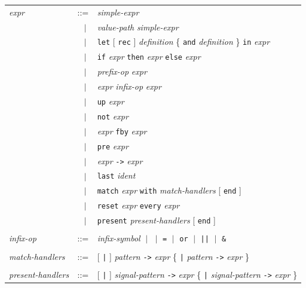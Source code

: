 \documentclass[11pt,titlepage,twoside]{report}
\newcommand{\alt}{\;|\;}
\newcommand{\Let}{\mbox{{\tt let}}}
\newcommand{\Rec}{\mbox{{\tt rec}}}
\newcommand{\In}{\mbox{{\tt in}}}
\newcommand{\And}{\mbox{{\tt and}}}
\newcommand{\Fun}{\mbox{{\tt fun}}}
\newcommand{\Function}{\mbox{{\tt function}}}
\newcommand{\If}{\mbox{{\tt if}}}
\newcommand{\Then}{\mbox{{\tt then}}}
\newcommand{\Else}{\mbox{{\tt else}}}
\newcommand{\Not}{\mbox{{\tt not}}}
\newcommand{\Up}{\mbox{{\tt up}}}
\newcommand{\Pre}{\mbox{{\tt pre}}}
\newcommand{\Last}{\mbox{{\tt last}}}
\newcommand{\Run}{\mbox{{\tt run}}}
\newcommand{\Fby}{\mbox{{\tt fby}}}
\newcommand{\Minusgreater}{\mbox{{\tt ->}}}
\newcommand{\Reset}{\mbox{{\tt reset}}}
\newcommand{\Every}{\mbox{{\tt every}}}
\newcommand{\End}{\mbox{{\tt end}}}
\newcommand{\Match}[2]{\mbox{\tt match}\ #1\ \mbox{\tt with}\ #2 \End}
\newcommand{\term}[1]{{\tt #1}}
\newcommand{\nterm}[1]{{\em #1}}
\begin{document}
\begin{center}
\begin{tabular}{lcl}
\nterm{expr}
   & ::=        & \nterm{simple-expr} \\
   & $\;\;\alt$ & \nterm{value-path} \nterm{simple-expr} \\
   & $\;\;\alt$ & \term{\Let} [ \term{\Rec} ] \nterm{definition}
                  \{ \term{\And} \nterm{definition} \} \term{\In} 
                  \nterm{expr} \\
   & $\;\;\alt$ & \term{\If} \nterm{expr} \term{\Then} \nterm{expr}
                  \term{\Else} \nterm{expr} \\
   & $\;\;\alt$ & \nterm{prefix-op} \nterm{expr} \\
   & $\;\;\alt$ & \nterm{expr} \nterm{infix-op} \nterm{expr} \\
   & $\;\;\alt$ & \term{\Up} \nterm{expr} \\
   & $\;\;\alt$ & \term{\Not} \nterm{expr} \\
      & $\;\;\alt$ & \nterm{expr} \term{\Fby} \nterm{expr} \\
   & $\;\;\alt$ & \term{\Pre} \nterm{expr} \\
   & $\;\;\alt$ & \nterm{expr} \term{\Minusgreater} \nterm{expr} \\
   & $\;\;\alt$ & \term{\Last} \nterm{ident} \\
   & $\;\;\alt$ & \term{match} \nterm{expr} \term{with} 
                  \nterm{match-handlers} [ \term{end} ] \\
   & $\;\;\alt$ & \term{reset} \nterm{expr} \term{every} \nterm{expr} \\ 
   & $\;\;\alt$ & \term{present} \nterm{present-handlers} [ \term{end} ]
\\ \\
\nterm{infix-op}                
& ::=        &
                \nterm{infix-symbol} 
                $\alt$ \term{*} 
                $\alt$ \term{=} 
                $\alt$ \term{or}
                $\alt$ \term{||}  
                $\alt$ \term{\&}
\\
\\
\nterm{match-handlers}
   & ::=        & [ \term{|} ] 
                  \nterm{pattern} \term{\Minusgreater} \nterm{expr}
                  \{ \term{|} 
                  \nterm{pattern} \term{\Minusgreater} \nterm{expr} \}
\\
\\
\nterm{present-handlers}
   & ::=        & [ \term{|} ] 
                  \nterm{signal-pattern} \term{->} \nterm{expr}
                  \{ \term{|}
                  \nterm{signal-pattern} \term{->} \nterm{expr} \} 
\end{tabular}
\end{center}
\end{document}
